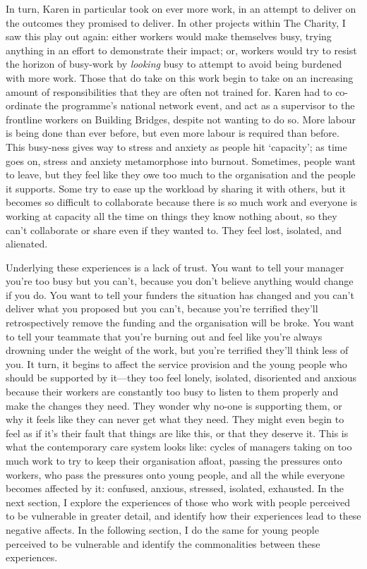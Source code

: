 In turn, Karen in particular took on ever more work, in an attempt to deliver on the outcomes they promised to deliver. In other projects within The Charity, I saw this play out again: either workers would make themselves busy, trying anything in an effort to demonstrate their impact; or, workers would try to resist the horizon of busy-work by \emph{looking} busy to attempt to avoid being burdened with more work. Those that do take on this work begin to take on an increasing amount of responsibilities that they are often not trained for. Karen had to co-ordinate the programme’s national network event, and act as a supervisor to the frontline workers on Building Bridges, despite not wanting to do so. More labour is being done than ever before, but even more labour is required than before. This busy-ness gives way to stress and anxiety as people hit `capacity'; as time goes on, stress and anxiety metamorphose into burnout. Sometimes, people want to leave, but they feel like they owe too much to the organisation and the people it supports. Some try to ease up the workload by sharing it with others, but it becomes so difficult to collaborate because there is so much work and everyone is working at capacity all the time on things they know nothing about, so they can’t collaborate or share even if they wanted to. They feel lost, isolated, and alienated.

Underlying these experiences is a lack of trust. You want to tell your manager you’re too busy but you can’t, because you don’t believe anything would change if you do. You want to tell your funders the situation has changed and you can’t deliver what you proposed but you can’t, because you’re terrified they’ll retrospectively remove the funding and the organisation will be broke. You want to tell your teammate that you’re burning out and feel like you’re always drowning under the weight of the work, but you’re terrified they’ll think less of you. It turn, it begins to affect the service provision and the young people who should be supported by it—they too feel lonely, isolated, disoriented and anxious because their workers are constantly too busy to listen to them properly and make the changes they need. They wonder why no-one is supporting them, or why it feels like they can never get what they need. They might even begin to feel as if it’s their fault that things are like this, or that they deserve it. This is what the contemporary care system looks like: cycles of managers taking on too much work to try to keep their organisation afloat, passing the pressures onto workers, who pass the pressures onto young people, and all the while everyone becomes affected by it: confused, anxious, stressed, isolated, exhausted. In the next section, I explore the experiences of those who work with people perceived to be vulnerable in greater detail, and identify how their experiences lead to these negative affects. In the following section, I do the same for young people perceived to be vulnerable and identify the commonalities between these experiences. 


